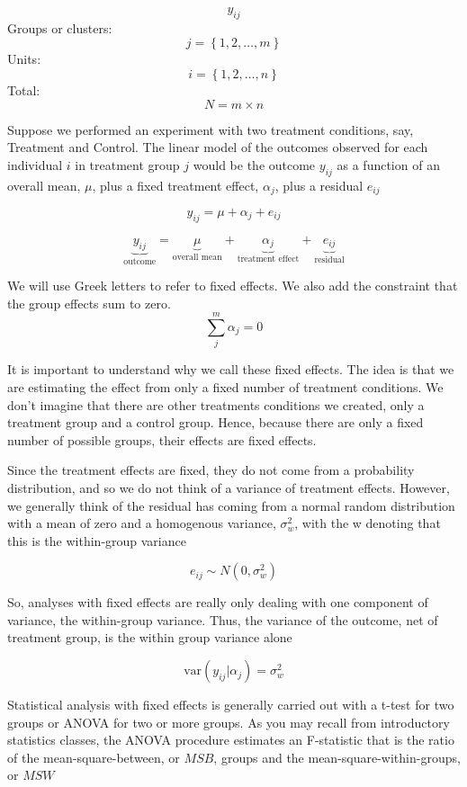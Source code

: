 \[
y_{ij}
\]
Groups or clusters:
\[
j = \left\{1,2,\dots,m\right\}
\]
Units:
\[
i = \left\{1,2,\dots,n\right\}
\]
Total:
\[
N = m\times n
\]

Suppose we performed an experiment with two treatment conditions, say, Treatment and Control. The linear model of the outcomes observed for each individual $i$ in treatment group $j$ would be the outcome $y_{ij}$ as a function of an overall mean, $\mu$, plus a fixed treatment effect, $\alpha_j$, plus a residual $e_{ij}$

\begin{equation}\label{genlinmod}
  y_{ij} = \mu + \alpha_j+e_{ij}
\end{equation}

\[
\underbrace{y_{ij}}_{\text{outcome}} = \underbrace{\mu}_{\text{overall mean}} + \underbrace{\alpha_j}_{\text{treatment effect}}+\underbrace{e_{ij}}_{\text{residual}}
\]

We will use Greek letters to refer to fixed effects. We also add the constraint that the group effects sum to zero.
\[
\sum_j^m \alpha_j = 0
\]

It is important to understand why we call these fixed effects. The idea is that we are estimating the effect from only a fixed number of treatment conditions. We don't imagine that there are other treatments conditions we created, only a treatment group and a control group. Hence, because there are only a fixed number of possible groups, their effects are fixed effects.

Since the treatment effects are fixed, they do not come from a probability distribution, and so we do not think of a variance of treatment effects. However, we generally think of the residual has coming from a normal random distribution with a mean of zero and a homogenous variance, $\sigma^2_w$, with the w denoting that this is the within-group variance

\begin{equation}
  e_{ij} \sim N\left(0,\sigma^2_w\right)
\end{equation}

So, analyses with fixed effects are really only dealing with one component of variance, the within-group variance. Thus, the variance of the outcome, net of treatment group, is the within group variance alone

\[
\mbox{var}\left(y_{ij}|\alpha_j\right) = \sigma_w^2
\]

Statistical analysis with fixed effects is generally carried out with a t-test for two groups or ANOVA for two or more groups. As you may recall from introductory statistics classes, the ANOVA procedure estimates an F-statistic that is the ratio of the mean-square-between, or $MSB$, groups and the mean-square-within-groups, or $MSW$

